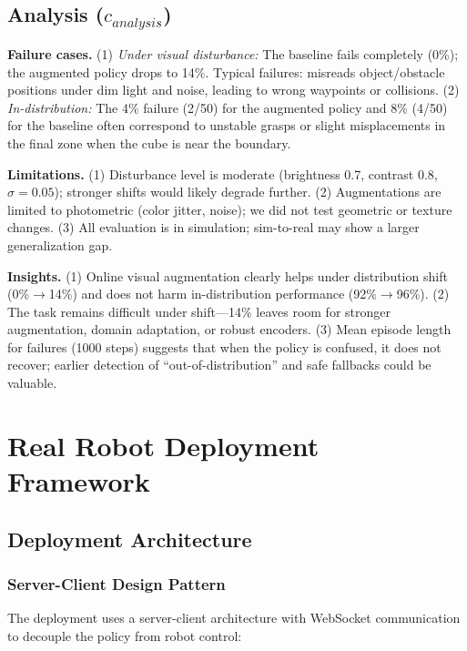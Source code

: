 \documentclass[10pt]{article} %
\begin{document}
\subsection{Analysis ($c_{analysis}$)}
\label{sec:custom_analysis}

\textbf{Failure cases.} (1) \emph{Under visual disturbance:} The baseline fails completely (0\%); the augmented policy drops to 14\%. Typical failures: misreads object/obstacle positions under dim light and noise, leading to wrong waypoints or collisions. (2) \emph{In-distribution:} The 4\% failure (2/50) for the augmented policy and 8\% (4/50) for the baseline often correspond to unstable grasps or slight misplacements in the final zone when the cube is near the boundary.

\textbf{Limitations.} (1) Disturbance level is moderate (brightness 0.7, contrast 0.8, $\sigma=0.05$); stronger shifts would likely degrade further. (2) Augmentations are limited to photometric (color jitter, noise); we did not test geometric or texture changes. (3) All evaluation is in simulation; sim-to-real may show a larger generalization gap.

\textbf{Insights.} (1) Online visual augmentation clearly helps under distribution shift (0\%$\to$14\%) and does not harm in-distribution performance (92\%$\to$96\%). (2) The task remains difficult under shift---14\% leaves room for stronger augmentation, domain adaptation, or robust encoders. (3) Mean episode length for failures (1000 steps) suggests that when the policy is confused, it does not recover; earlier detection of ``out-of-distribution'' and safe fallbacks could be valuable.

\section{Real Robot Deployment Framework}

\subsection{Deployment Architecture}

\subsubsection{Server-Client Design Pattern}

The deployment uses a server-client architecture with WebSocket communication to decouple the policy from robot control:
\end{document}

